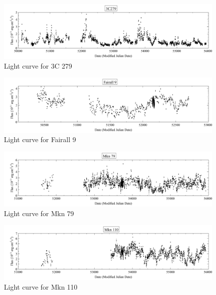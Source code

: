 \documentclass[12pt, oneside]{smuthesis}
\begin{document}
\begin{figure}[H]
\centering
\includegraphics[width=\linewidth]{3C279lightcurve}
\caption{Light curve for 3C 279}
\label{fig:3c279lc}
\end{figure}

\begin{figure}[H]
\centering
\includegraphics[width=\linewidth]{Fairall9lightcurve}
\caption{Light curve for Fairall 9}
\label{fig:fairall9lc}
\end{figure}

\begin{figure}[H]
\centering
\includegraphics[width=\linewidth]{Mkn79lightcurve}
\caption{Light curve for Mkn 79}
\label{fig:mkn79lc}
\end{figure}

\begin{figure}[H]
\centering
\includegraphics[width=\linewidth]{Mkn110lightcurve}
\caption{Light curve for Mkn 110}
\label{fig:mkn110lc}
\end{figure}
\end{document}

